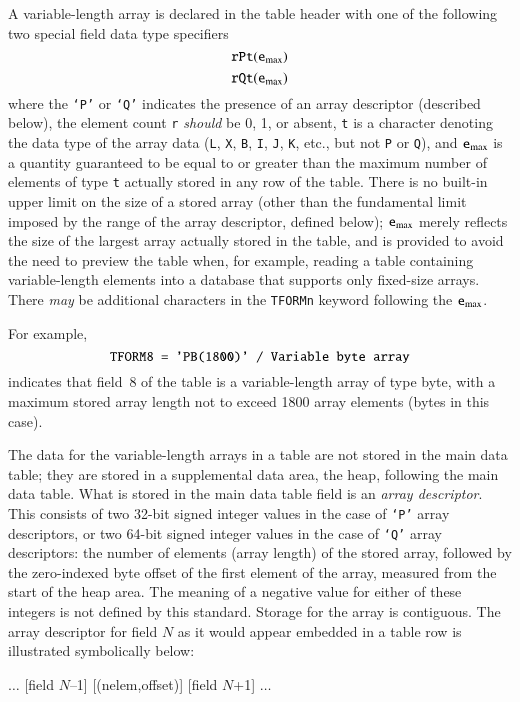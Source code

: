 \documentclass[onecolumn]{aa}
\begin{document}
A variable-length array is declared in the table header with one of the following
two special field data type specifiers 
\[ {\tt rPt}({\tt e}_{\rm max}) \]
\[ {\tt rQt}({\tt e}_{\rm max}) \]
where the {\tt `P'} or {\tt `Q'} indicates the presence of an array descriptor 
(described below), the
element count {\tt r} {\em should} be 0, 1, or absent, {\tt t} is a character denoting
the data type of the array data ({\tt L},  {\tt X}, {\tt B},
{\tt I}, {\tt J}, {\tt K}, etc., but not {\tt P} or {\tt Q}), and ${\tt e}_{\rm max}$ is a
quantity guaranteed to be equal to or greater than the maximum number
of elements of type {\tt t} actually stored in any row of the table. There
is no built-in upper limit on the size of a stored array
(other than the fundamental limit imposed by the range of the array
descriptor, defined below);
${\tt e}_{\rm max}$ merely reflects the size of the largest array actually
stored in the table, and is provided to avoid the need to preview the
table when, for example, reading a table containing variable-length
elements into a database that supports only fixed-size arrays.  There
{\em may} be additional characters in the {\tt TFORMn} keyword
following the ${\tt e}_{\rm max}$.

For example,
\[\mbox{{\tt TFORM8  = 'PB(1800)'   / Variable byte array}} \]
indicates that field~8 of the table is a variable-length array of type
byte, with a maximum stored array length not to exceed 1800 array
elements (bytes in this case).

The data for the variable-length arrays in a table are not stored in
the main data table; they are stored in a supplemental data area, the
heap, following the main data table. 
What is stored in
the main data table field is an {\em array descriptor}.  This consists of two
32-bit signed integer values in the case of {\tt `P'} array descriptors,
or two 64-bit signed integer values in the case of {\tt `Q'} array
descriptors: the number of elements (array length) of the
stored array, followed by the zero-indexed byte offset of the first
element of the array, measured from the start of the heap area.
The meaning of a negative value for either of these integers is not
defined by this standard.
Storage for the array is contiguous.  The array descriptor for field
$N$ as it would appear embedded in a table row is illustrated
symbolically below:

\begin{center}
$\ldots$ [field $N$--1] [(nelem,offset)] [field $N$+1] $\ldots$
\end{center}
\end{document}

